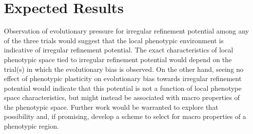 \section{Expected Results}
Observation of evolutionary pressure for irregular refinement potential among any of the three trials would suggest that the local phenotypic environment is indicative of irregular refinement potential. The exact characteristics of local phenotypic space tied to irregular refinement potential would depend on the trial(s) in which the evolutionary bias is observed. On the other hand, seeing no effect of phenotypic plasticity on evolutionary bias towards irregular refinement potential would indicate that this potential is not a function of local phenotype space characteristics, but might instead be associated with macro properties of the phenotypic space. Further work would be warranted to explore that possibility and, if promising, develop a scheme to select for macro properties of a phenotypic region.
